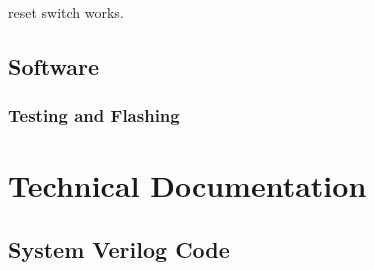 \documentclass[11pt]{article}
\begin{document}
reset switch works.




\subsection{Software}



\label{sec:software_LEDbar}

\subsubsection{Testing and Flashing}



\section{Technical Documentation}



\subsection{System Verilog Code}
\end{document}
